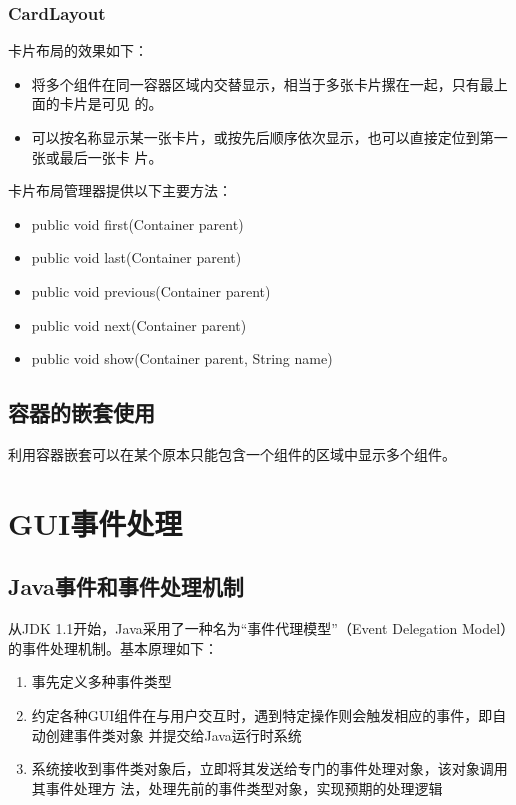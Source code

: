 
\subsubsection{CardLayout}

卡片布局的效果如下：

\begin{itemize}
\item 将多个组件在同一容器区域内交替显示，相当于多张卡片摞在一起，只有最上面的卡片是可见
  的。
\item 可以按名称显示某一张卡片，或按先后顺序依次显示，也可以直接定位到第一张或最后一张卡
  片。
\end{itemize}

卡片布局管理器提供以下主要方法：

\begin{itemize}
\item public void first(Container parent)
\item public void last(Container parent)
\item public void previous(Container parent)
\item public void next(Container parent)
\item public void show(Container parent, String name)
\end{itemize}

  

\subsection{容器的嵌套使用}

利用容器嵌套可以在某个原本只能包含一个组件的区域中显示多个组件。


\section{GUI事件处理}

\subsection{Java事件和事件处理机制}

从JDK 1.1开始，Java采用了一种名为“{\hei 事件代理模型}”（Event
Delegation Model）的事件处理机制。基本原理如下：

\begin{enumerate}\kai
\item 事先定义多种事件类型
\item 约定各种GUI组件在与用户交互时，遇到特定操作则会触发相应的事件，即自动创建事件类对象
  并提交给Java运行时系统
\item 系统接收到事件类对象后，立即将其发送给专门的事件处理对象，该对象调用其事件处理方
  法，处理先前的事件类型对象，实现预期的处理逻辑
\end{enumerate}

